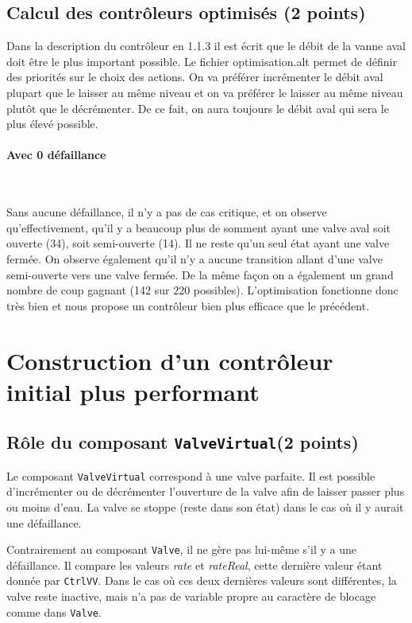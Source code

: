 \documentclass[a4paper]{book}
\begin{document}
\subsection{Calcul des contrôleurs optimisés (2 points)}

Dans la description du contrôleur en 1.1.3 il est écrit que le débit de la vanne aval doit être le plus important possible.
Le fichier optimisation.alt permet de définir des priorités sur le choix des actions. On va préférer incrémenter le débit aval 
plupart que le laisser au même niveau et on va préférer le laisser au même niveau plutôt que le décrémenter. De ce fait, on aura 
toujours le débit aval qui sera le plus élevé possible.
\paragraph{Avec 0 défaillance}\

Sans aucune défaillance, il n'y a pas de cas critique, et on observe qu'effectivement, qu'il 
y a beaucoup plus de somment ayant une valve aval soit ouverte (34), soit semi-ouverte (14). Il ne reste qu'un seul état
ayant une valve fermée. On observe également qu'il n'y a aucune transition allant d'une valve semi-ouverte vers une valve fermée.
De la même façon on a également un grand nombre de coup gagnant (142 sur 220 possibles).
L'optimisation fonctionne donc très bien et nous propose un contrôleur bien plus efficace que le précédent.
\section{Construction d'un contrôleur initial plus performant}
\subsection{Rôle du composant {\tt ValveVirtual}(2 points)}
Le composant {\tt ValveVirtual} correspond à une valve parfaite. Il est possible d'incrémenter ou de décrémenter l'ouverture 
de la valve afin de laisser passer plus ou moins d'eau. La valve se stoppe (reste dans son état) dans le cas où il y aurait une défaillance.

Contrairement au composant {\tt Valve}, il ne gère pas lui-même s'il y a une défaillance. Il compare les valeurs \textit{rate} et 
\textit{rateReal}, cette dernière valeur étant donnée par {\tt CtrlVV}. Dans le cas où ces deux dernières valeurs sont différentes, 
la valve reste inactive, mais n'a pas de variable propre au caractère de blocage comme dans {\tt Valve}.
\end{document}
